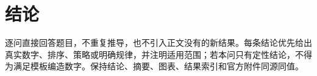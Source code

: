 \section{结论}

逐问直接回答题目，不重复推导，也不引入正文没有的新结果。每条结论优先给出真实数字、排序、策略或明确规律，并注明适用范围；若本问只有定性结论，不得为满足模板编造数字。保持结论、摘要、图表、结果索引和官方附件同源同值。
